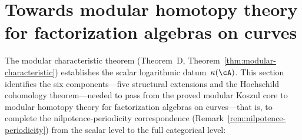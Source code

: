 \section[Towards modular homotopy theory]{Towards modular homotopy theory for factorization algebras on curves}
\label{sec:modular-koszul-programme}

The modular characteristic theorem (Theorem~D,
Theorem~\ref{thm:modular-characteristic}) establishes the scalar
logarithmic datum~$\kappa(\cA)$.  This section identifies the six
components---five structural extensions and the Hochschild
cohomology theorem---needed to pass from the proved modular Koszul
core to modular homotopy theory for factorization algebras on
curves---that is, to complete the nilpotence-periodicity
correspondence
(Remark~\ref{rem:nilpotence-periodicity}) from the scalar level to
the full categorical level:

